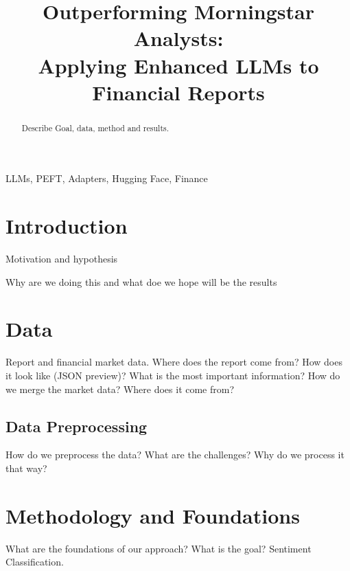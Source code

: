 \documentclass[conference]{IEEEtran}
\begin{document}
\title{Outperforming Morningstar Analysts: \\ Applying Enhanced LLMs to Financial Reports
}

\author{
\and
{}
}

\maketitle

\begin{abstract}
Describe Goal, data, method and results.
\end{abstract}

\begin{IEEEkeywords}
LLMs, PEFT, Adapters, Hugging Face, Finance
\end{IEEEkeywords}

\section{Introduction}
Motivation and hypothesis \cite{Poth2023,Kokhlikyan2020,Russell2021,Kauermann2021}

Why are we doing this and what doe we hope will be the results
\section{Data}
Report and financial market data.
Where does the report come from? How does it look like (JSON preview)? What is the most important information?
How do we merge the market data? Where does it come from?
\subsection{Data Preprocessing}
How do we preprocess the data? What are the challenges?
Why do we process it that way?

\section{Methodology and Foundations}
What are the foundations of our approach? What is the goal? Sentiment Classification.
\end{document}
